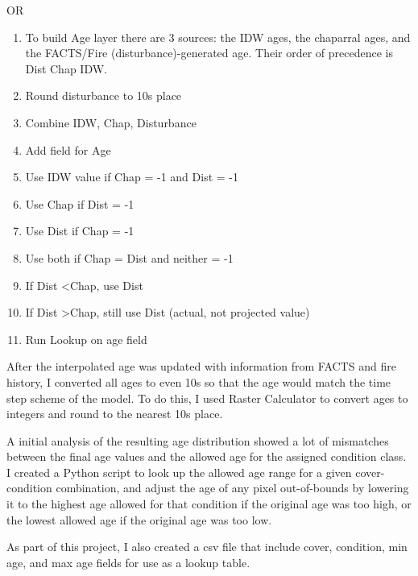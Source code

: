OR

\begin{enumerate}
    \item To build Age layer there are 3 sources: the IDW ages, the chaparral ages, and the FACTS/Fire (disturbance)-generated age. Their order of precedence is Dist \textrightarrow Chap \textrightarrow IDW.
    \item Round disturbance to 10s place
    \item Combine IDW, Chap, Disturbance
    \item Add field for Age
    \item Use IDW value if Chap = -1 and Dist = -1
    \item Use Chap if Dist = -1
    \item Use Dist if Chap = -1
    \item Use both if Chap = Dist and neither = -1
    \item If Dist \textless Chap, use Dist
    \item If Dist \textgreater Chap, still use Dist (actual, not projected value)
    \item Run Lookup on age field
\end{enumerate}


After the interpolated age was updated with information from FACTS and fire history, I converted all ages to even 10s so that the age would match the time step scheme of the model. To do this, I used Raster Calculator to convert ages to integers and round to the nearest 10s place.

A initial analysis of the resulting age distribution showed a lot of mismatches between the final age values and the allowed age for the assigned condition class. I created a Python script to look up the allowed age range for a given cover-condition combination, and adjust the age of any pixel out-of-bounds by lowering it to the highest age allowed for that condition if the original age was too high, or the lowest allowed age if the original age was too low. 

As part of this project, I also created a csv file that include cover, condition, min age, and max age fields for use as a lookup table.


